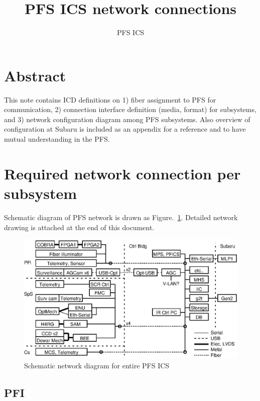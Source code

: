 \documentclass[a4paper,notitlepage]{article}
\title{PFS ICS network connections}
\author{PFS ICS}
\begin{document}
\drafttrue
{}

\ssnhead

\section{Abstract}

This note contains ICD definitions on 
1) fiber assignment to PFS for communication, 
2) connection interface definition (media, format) for subsystems, 
and 3) network configuration diagram among PFS subsystems. 
Also overview of configuration at Subaru is included as an appendix 
for a reference and to have mutual understanding in the PFS. 


\section{Required network connection per subsystem}

Schematic diagram of PFS network is drawn as Figure.~\ref{fig:network}.
Detailed network drawing is attached at the end of this document. 

\begin{figure}[htb]
  \begin{center}
    \includegraphics{networks-list.eps}
  \end{center}
  \caption{Schematic network diagram for entire PFS ICS}
  \label{fig:network}
\end{figure}

\subsection{PFI}
\end{document}
